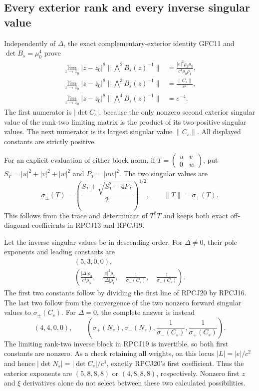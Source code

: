 \documentclass[11pt]{article}
\begin{document}
\subsection{Every exterior rank and every inverse singular value}
Independently of $\Delta$, the exact complementary-exterior identity
GFC11 and $\det B_s=\mu_0^4$ prove
\[
 \begin{split}
 \lim_{z\to z_0}|z-z_0|^8\|\bigwedge^2B_s(z)^{-1}\|
   &=\frac{|e|^2\rho_2\rho_3}{c^4\rho_0\rho_1},\\
 \lim_{z\to z_0}|z-z_0|^8\|\bigwedge^3B_s(z)^{-1}\|
   &=\frac{\|C_s\|}{c^4},\\
 \lim_{z\to z_0}|z-z_0|^8\|\bigwedge^4B_s(z)^{-1}\|
   &=c^{-4}.
 \end{split}\tag{RPCJ20}
\]
The first numerator is $|\det C_s|$, because the only nonzero
second exterior singular value of the rank-two limiting matrix is
the product of its two positive singular values. The next numerator
is its largest singular value $\|C_s\|$.
All displayed constants are strictly positive.

For an explicit evaluation of either block norm, if
$T=\left(\begin{smallmatrix}u&v\\0&w\end{smallmatrix}\right)$,
put $S_T=|u|^2+|v|^2+|w|^2$ and $P_T=|uw|^2$.
The two singular values are
\[
 \sigma_\pm(T)=
 \left(\frac{S_T\pm\sqrt{S_T^2-4P_T}}2\right)^{1/2},
 \qquad\|T\|=\sigma_+(T).
 \tag{RPCJ21}
\]
This follows from the trace and determinant of $T^*T$ and keeps
both exact off-diagonal coefficients in RPCJ13 and RPCJ19.

Let the inverse singular values be in descending order.
For $\Delta\ne0$, their pole exponents and leading constants are
\[
 \begin{gathered}
       (5,3,0,0),\\
 \left(
 \frac{|\Delta|\rho_3}{c^4\rho_0},\quad
 \frac{|e|^2\rho_2}{|\Delta|\rho_1},\quad
 \frac1{\sigma_-(C_s)},\quad\frac1{\sigma_+(C_s)}
 \right).
 \end{gathered}\tag{RPCJ22}
\]
The first two constants follow by dividing the first line of RPCJ20
by RPCJ16. The last two follow from the convergence of the two
nonzero forward singular values to $\sigma_\pm(C_s)$.
For $\Delta=0$, the complete answer is instead
\[
       (4,4,0,0),\qquad
 \left(\sigma_+(N_s),\sigma_-(N_s),
       \frac1{\sigma_-(C_s)},\frac1{\sigma_+(C_s)}\right).
 \tag{RPCJ23}
\]
The limiting rank-two inverse block in RPCJ19 is invertible, so both
first constants are nonzero. As a check retaining all weights,
on this locus $|L|=|e|/c^2$ and hence
$|\det N_s|=|\det C_s|/c^4$, exactly RPCJ20's first coefficient.
Thus the exterior exponents are $(5,8,8,8)$ or $(4,8,8,8)$,
respectively. Nonzero first $z$ and $\xi$ derivatives alone do not
select between these two calculated possibilities.
\end{document}
